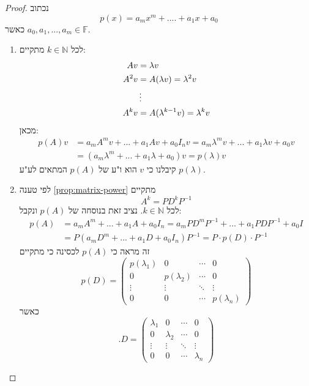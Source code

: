 \documentclass[12pt]{report}
\theoremstyle{plain}
\theoremstyle{definition}
\newcommand{\N}{\mathbb{N}}
\newcommand{\F}{\mathbb{F}}
\newcommand{\0}{\mathbf{0}}
\begin{document}
\begin{proof}
נכתוב
$$
p(x)=a_mx^m+....+a_1x+a_0
$$
כאשר
$a_0,a_1,...,a_m\in\F$.
\begin{enumerate}[label=\alph*.]
\item 
לכל
$k\in\N$
מתקיים:
$$
\begin{aligned}
Av&=\lambda v \\
A^2v&=A(\lambda v)=\lambda^2 v \\
&\thinspace\vdots \\
A^kv&=A(\lambda^{k-1}v)=\lambda^k v
\end{aligned}
$$
מכאן:
$$
\begin{aligned}
p(A)v&=a_mA^mv+...+a_1Av+a_0I_nv=a_m\lambda^mv+...+a_1\lambda v+a_0v \\
&=(a_m\lambda^m+...+a_1\lambda+a_0)v=p(\lambda)v
\end{aligned}
$$
קיבלנו כי 
$v$
הוא ו"ע של
$p(A)$
המתאים לע"ע
$p(\lambda)$.


\item
לפי טענה 
\ref{prop:matrix-power}
מתקיים
$$
A^k=PD^kP^{-1}
$$
לכל
$k\in\N$. 
נציב זאת בנוסחה של 
$p(A)$
ונקבל:
$$
\begin{aligned}
p(A)&=a_mA^m+...+a_1A+a_0I_n=a_mPD^mP^{-1}+...+a_1PDP^{-1}+a_0I \\
&=P(a_mD^m+...+a_1D+a_0I_n)P^{-1}=P\cdot p(D)\cdot P^{-1}
\end{aligned}
$$
זה מראה כי 
$p(A)$
לכסינה כי מתקיים
$$
p(D)=\begin{pmatrix}
p(\lambda_1) & 0 & \cdots & 0 \\
0 & p(\lambda_2) & \cdots & 0 \\
\vdots & \vdots & \ddots & \vdots \\
0 & 0 & \cdots & p(\lambda_n)
\end{pmatrix}
$$
כאשר
$$
.D=\begin{pmatrix}
\lambda_1 & 0 & \cdots & 0 \\
0 & \lambda_2 & \cdots & 0 \\
\vdots & \vdots & \ddots & \vdots \\
0 & 0 & \cdots & \lambda_n
\end{pmatrix}
$$


\end{enumerate}
\end{proof}
\end{document}
